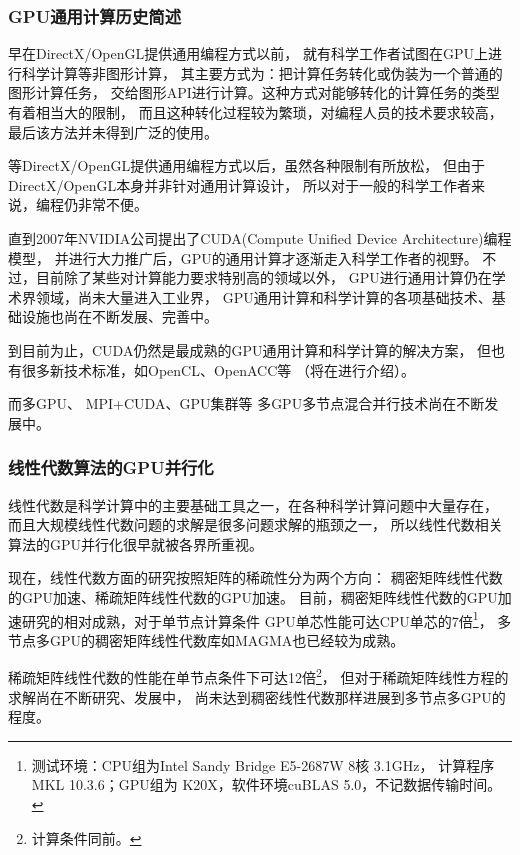 \subsubsection{GPU通用计算历史简述}

早在DirectX/OpenGL提供通用编程方式以前，
就有科学工作者试图在GPU上进行科学计算等非图形计算，
其主要方式为：把计算任务转化或伪装为一个普通的图形计算任务，
交给图形API进行计算。这种方式对能够转化的计算任务的类型有着相当大的限制，
而且这种转化过程较为繁琐，对编程人员的技术要求较高，
最后该方法并未得到广泛的使用。

等DirectX/OpenGL提供通用编程方式以后，虽然各种限制有所放松，
但由于DirectX/OpenGL本身并非针对通用计算设计，
所以对于一般的科学工作者来说，编程仍非常不便。

直到2007年NVIDIA公司提出了CUDA(Compute Unified Device Architecture)编程模型，
并进行大力推广后，GPU的通用计算才逐渐走入科学工作者的视野。
不过，目前除了某些对计算能力要求特别高的领域以外，
GPU进行通用计算仍在学术界领域，尚未大量进入工业界，
GPU通用计算和科学计算的各项基础技术、基础设施也尚在不断发展、完善中。

到目前为止，CUDA仍然是最成熟的GPU通用计算和科学计算的解决方案，
但也有很多新技术标准，如OpenCL、OpenACC等
（将在进行介绍）。

而多GPU\cite{LeviGTC2013}、
MPI+CUDA\cite{Jiri2013}、GPU集群\cite{StefanGTC2013}等
多GPU多节点混合并行技术尚在不断发展中。

\subsubsection{线性代数算法的GPU并行化}

线性代数是科学计算中的主要基础工具之一，在各种科学计算问题中大量存在，
而且大规模线性代数问题的求解是很多问题求解的瓶颈之一，
所以线性代数相关算法的GPU并行化很早就被各界所重视。

现在，线性代数方面的研究按照矩阵的稀疏性分为两个方向：
稠密矩阵线性代数的GPU加速、稀疏矩阵线性代数的GPU加速。
目前，稠密矩阵线性代数的GPU加速研究的相对成熟，对于单节点计算条件
GPU单芯性能可达CPU单芯的7倍\footnote{测试环境：CPU组为Intel Sandy Bridge E5-2687W 8核 3.1GHz，
计算程序MKL 10.3.6；GPU组为 K20X，软件环境cuBLAS 5.0，不记数据传输时间。}\cite{WillGTC2013}，
多节点多GPU的稠密矩阵线性代数库如MAGMA\cite{horton2011class}也已经较为成熟。

稀疏矩阵线性代数的性能在单节点条件下可达12倍\footnote{计算条件同前。}，
但对于稀疏矩阵线性方程的求解尚在不断研究、发展中\cite{KyleGTC2013}，
尚未达到稠密线性代数那样进展到多节点多GPU的程度。

